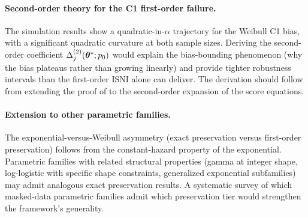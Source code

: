 \paragraph{Second-order theory for the C1 first-order failure.}
The simulation results show a quadratic-in-$\alpha$ trajectory for the
Weibull C1 bias, with a significant quadratic curvature at both
sample sizes. Deriving the second-order coefficient
$\Delta^{(2)}_j(\bm{\theta}^*; p_0)$ would explain the bias-bounding
phenomenon (why the bias plateaus rather than growing linearly) and
provide tighter robustness intervals than the first-order ISNI alone
can deliver. The derivation should follow from extending the proof of
 to the second-order expansion of the score
equations.

\paragraph{Extension to other parametric families.}
The exponential-versus-Weibull asymmetry (exact preservation versus
first-order preservation) follows from the constant-hazard property of
the exponential. Parametric families with related structural properties
(gamma at integer shape, log-logistic with specific shape constraints,
generalized exponential subfamilies) may admit analogous exact
preservation results. A systematic survey of which masked-data
parametric families admit which preservation tier would strengthen
the framework's generality.
